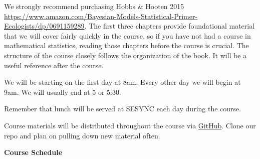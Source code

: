 \documentclass[11pt]{article}
\begin{document}
We strongly recommend purchasing Hobbs \& Hooten 2015 \href{https://www.amazon.com/Bayesian-Models-Statistical-Primer-Ecologists/dp/0691159289}{https://www.amazon.com/Bayesian-Models-Statistical-Primer-Ecologists/dp/0691159289}. The first three chapters provide foundational material that we will cover fairly quickly in the course, so if you have not had a course in mathematical statistics, reading those chapters before the course is crucial. The structure of the course closely follows the organization of the book.  It will be a useful reference after the course.

We will be starting on the first day at 8am.  Every other day we will begin at 9am. We will usually end at 5 or 5:30.  

Remember that lunch will be served at SESYNC each day during the course.

Course materials will be distributed throughout the course via \href{https://github.com/CCheCastaldo/SESYNCBayes}{GitHub}.  Clone our repo and plan on pulling down new material often.

\newpage
\begin{center}
\textbf{\large Course Schedule}
\end{center}
\end{document}

